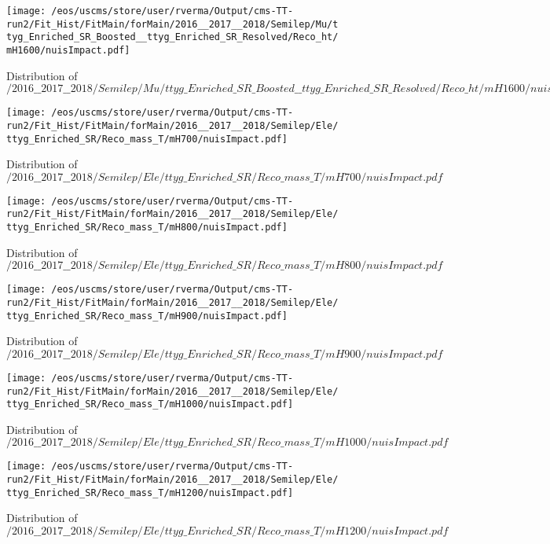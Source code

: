 \begin{figure}
\centering
\texttt{[image: /eos/uscms/store/user/rverma/Output/cms-TT-run2/Fit\_Hist/FitMain/forMain/2016\_\_2017\_\_2018/Semilep/Mu/ttyg\_Enriched\_SR\_Boosted\_\_ttyg\_Enriched\_SR\_Resolved/Reco\_ht/mH1600/nuisImpact.pdf]}
\caption{Distribution of $/2016\_\_2017\_\_2018/Semilep/Mu/ttyg\_Enriched\_SR\_Boosted\_\_ttyg\_Enriched\_SR\_Resolved/Reco\_ht/mH1600/nuisImpact.pdf$}
\end{figure}

\begin{figure}
\centering
\texttt{[image: /eos/uscms/store/user/rverma/Output/cms-TT-run2/Fit\_Hist/FitMain/forMain/2016\_\_2017\_\_2018/Semilep/Ele/ttyg\_Enriched\_SR/Reco\_mass\_T/mH700/nuisImpact.pdf]}
\caption{Distribution of $/2016\_\_2017\_\_2018/Semilep/Ele/ttyg\_Enriched\_SR/Reco\_mass\_T/mH700/nuisImpact.pdf$}
\end{figure}

\begin{figure}
\centering
\texttt{[image: /eos/uscms/store/user/rverma/Output/cms-TT-run2/Fit\_Hist/FitMain/forMain/2016\_\_2017\_\_2018/Semilep/Ele/ttyg\_Enriched\_SR/Reco\_mass\_T/mH800/nuisImpact.pdf]}
\caption{Distribution of $/2016\_\_2017\_\_2018/Semilep/Ele/ttyg\_Enriched\_SR/Reco\_mass\_T/mH800/nuisImpact.pdf$}
\end{figure}

\begin{figure}
\centering
\texttt{[image: /eos/uscms/store/user/rverma/Output/cms-TT-run2/Fit\_Hist/FitMain/forMain/2016\_\_2017\_\_2018/Semilep/Ele/ttyg\_Enriched\_SR/Reco\_mass\_T/mH900/nuisImpact.pdf]}
\caption{Distribution of $/2016\_\_2017\_\_2018/Semilep/Ele/ttyg\_Enriched\_SR/Reco\_mass\_T/mH900/nuisImpact.pdf$}
\end{figure}

\begin{figure}
\centering
\texttt{[image: /eos/uscms/store/user/rverma/Output/cms-TT-run2/Fit\_Hist/FitMain/forMain/2016\_\_2017\_\_2018/Semilep/Ele/ttyg\_Enriched\_SR/Reco\_mass\_T/mH1000/nuisImpact.pdf]}
\caption{Distribution of $/2016\_\_2017\_\_2018/Semilep/Ele/ttyg\_Enriched\_SR/Reco\_mass\_T/mH1000/nuisImpact.pdf$}
\end{figure}

\begin{figure}
\centering
\texttt{[image: /eos/uscms/store/user/rverma/Output/cms-TT-run2/Fit\_Hist/FitMain/forMain/2016\_\_2017\_\_2018/Semilep/Ele/ttyg\_Enriched\_SR/Reco\_mass\_T/mH1200/nuisImpact.pdf]}
\caption{Distribution of $/2016\_\_2017\_\_2018/Semilep/Ele/ttyg\_Enriched\_SR/Reco\_mass\_T/mH1200/nuisImpact.pdf$}
\end{figure}

